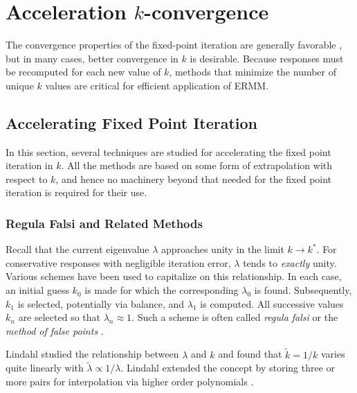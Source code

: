 \section{Acceleration $k$-convergence}

The convergence properties of the fixed-point iteration
are generally favorable \cite{robertsXXX}, but in many cases,
better convergence in $k$ is desirable.  Because responses 
must be recomputed for each new value of $k$,  methods that 
minimize the number of unique $k$ values are critical for 
efficient application of ERMM.

\subsection{Accelerating Fixed Point Iteration}

In this section, several techniques are studied for 
accelerating the fixed point iteration in $k$.  All 
the methods are based on some form of extrapolation with respect to 
$k$, and hence no machinery beyond that needed for the 
fixed point iteration is required for their use.

\subsubsection{Regula Falsi and Related Methods}
\label{sec:extrapolationmethods}

Recall that the current eigenvalue $\lambda$ approaches unity in the 
limit $k\to k^*$.  For conservative responses with negligible 
iteration error, $\lambda$ tends to {\it exactly} unity.  Various 
schemes have been used to capitalize on this relationship.  In each 
case, an initial guess $k_0$ is made for which the corresponding 
$\lambda_0$ is found.  Subsequently, $k_1$ is selected, potentially via 
balance, and $\lambda_1$ is computed.  All successive values $k_n$  
are selected so that $\lambda_n \approx 1$.  Such a scheme is often
called {\it regula falsi} or the {\it method of false points} 
\cite{lindahl1976mdr}.

Lindahl studied the relationship between $\lambda$ and $k$ and found that 
$\tilde{k} = 1/k$ varies quite 
linearly with $\tilde{\lambda} \propto 1/\lambda$.
Lindahl extended the concept by storing three or more pairs for interpolation
via higher order polynomials \cite{lindahl1976mdr}.

